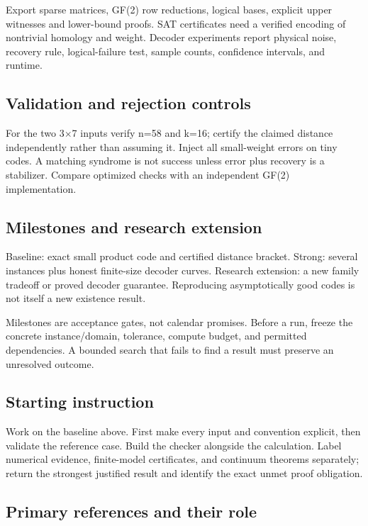 \documentclass[
  11pt,
]{article}
\begin{document}
Export sparse matrices, GF(2) row reductions, logical bases, explicit
upper witnesses and lower-bound proofs. SAT certificates need a verified
encoding of nontrivial homology and weight. Decoder experiments report
physical noise, recovery rule, logical-failure test, sample counts,
confidence intervals, and runtime.

\subsection{Validation and rejection controls}

For the two 3\ensuremath{\times}7 inputs verify n=58 and k=16; certify
the claimed distance independently rather than assuming it. Inject all
small-weight errors on tiny codes. A matching syndrome is not success
unless error plus recovery is a stabilizer. Compare optimized checks
with an independent GF(2) implementation.

\subsection{Milestones and research extension}

Baseline: exact small product code and certified distance bracket.
Strong: several instances plus honest finite-size decoder curves.
Research extension: a new family tradeoff or proved decoder guarantee.
Reproducing asymptotically good codes is not itself a new existence
result.

Milestones are acceptance gates, not calendar promises. Before a run,
freeze the concrete instance/domain, tolerance, compute budget, and
permitted dependencies. A bounded search that fails to find a result
must preserve an unresolved outcome.

\subsection{Starting instruction}

Work on the baseline above. First make every input and convention
explicit, then validate the reference case. Build the checker alongside
the calculation. Label numerical evidence, finite-model certificates,
and continuum theorems separately; return the strongest justified result
and identify the exact unmet proof obligation.

\subsection{Primary references and their role}
\end{document}
